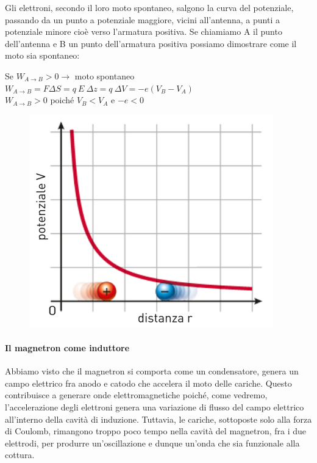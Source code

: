 \documentclass{article}
\begin{document}
Gli elettroni, secondo il loro moto spontaneo, salgono la curva del potenziale, passando da un punto a potenziale maggiore, vicini all'antenna, a punti a potenziale minore cioè verso l'armatura positiva. Se chiamiamo A il punto dell'antenna e B un punto dell'armatura positiva possiamo dimostrare come il moto sia  spontaneo:

\begin{center}
Se $ W_{A\to B} > 0 \to$ moto spontaneo  \\ 
$W_{A\to B} = F\Delta S =  q \ E \ \Delta z  = q \ \Delta V =  -e (V_{B} - V_{A})$  \\
 $ W_{A\to B} > 0$ poiché $V_{B} < V_{A}$  e $-e<0$  \\
\end{center}
\vspace*{-0.2in}
\begin{figure}[h]
\centering
\includegraphics[scale=0.23]{7.png}
\label{fig: cubed graph}
\end{figure}

\newpage
\paragraph{Il magnetron come induttore}
Abbiamo visto che il magnetron si comporta come un condensatore, genera un campo elettrico fra anodo e catodo che accelera il moto delle cariche. Questo contribuisce a generare onde elettromagnetiche poiché, come vedremo, l'accelerazione degli elettroni genera una variazione di flusso del campo elettrico all'interno della cavità di induzione. Tuttavia, le cariche, sottoposte solo alla forza di Coulomb, rimangono troppo poco tempo nella cavità del magnetron, fra i due elettrodi, per produrre un'oscillazione e dunque un'onda che sia funzionale alla cottura. \\ 
\end{document}
